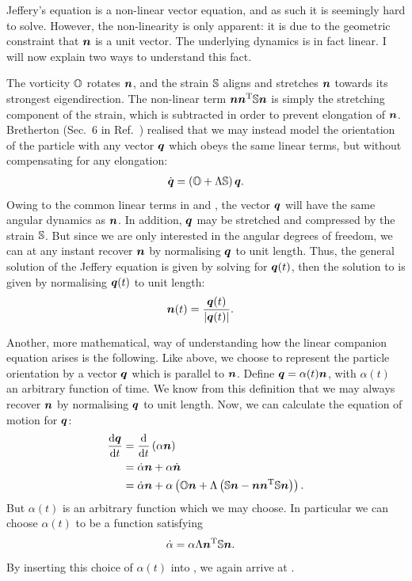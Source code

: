 \documentclass[thesis.tex]{subfiles}
\begin{document}
Jeffery's equation is a non-linear vector equation, and as such it is seemingly hard to solve. However, the non-linearity is only apparent: it is due to the geometric constraint that $\mbox{\boldmath$n$}$ is a unit vector. The underlying dynamics is in fact linear. I will now explain two ways to understand this fact.

The vorticity $\mathbb{O}$ rotates $\mbox{\boldmath$n$}$, and the strain $\mathbb{S}$ aligns and stretches $\mbox{\boldmath$n$}$ towards its strongest eigendirection. The non-linear term $\mbox{\boldmath$n$} \mbox{\boldmath$n$}^{\mathrm T} \mathbb{S} \mbox{\boldmath$n$}$ is simply the stretching component of the strain, which is subtracted in order to prevent elongation of $\mbox{\boldmath$n$}$. Bretherton (Sec.~6 in Ref.~\cite{bretherton1962}) realised that we may instead model the orientation of the particle with any vector $\mbox{\boldmath$q$}$ which obeys the same linear terms, but without compensating for any elongation:
\begin{align}
	\dot{\ve q} = \left(\ma O + \Lambda \ma S\right) \ve q.\eqnlab{jefferyq}
\end{align}
Owing to the common linear terms in  and , the vector $\mbox{\boldmath$q$}$ will have the same angular dynamics as $\mbox{\boldmath$n$}$. In addition, $\mbox{\boldmath$q$}$ may be stretched and compressed by the strain $\mathbb{S}$. But since we are only interested in the angular degrees of freedom, we can at any instant recover $\mbox{\boldmath$n$}$ by normalising $\mbox{\boldmath$q$}$ to unit length. Thus, the general solution of the Jeffery equation is given by solving  for $\mbox{\boldmath$q$}(t)$, then the solution to  is given by normalising $\mbox{\boldmath$q$}(t)$ to unit length:
\begin{align}
	\ve n(t) &= \frac{\ve q(t)}{|\ve q(t)|}.\eqnlab{jefferysolution0}
\end{align}

Another, more mathematical, way of understanding how the linear companion equation  arises is the following. Like above, we choose to represent the particle orientation by a vector $\mbox{\boldmath$q$}$ which is parallel to $\mbox{\boldmath$n$}$. Define $\mbox{\boldmath$q$} = \alpha(t)\mbox{\boldmath$n$}$, with $\alpha(t)$ an arbitrary function of time. We know from this definition that we may always recover $\mbox{\boldmath$n$}$ by normalising $\mbox{\boldmath$q$}$ to unit length. Now, we can calculate the equation of motion for $\mbox{\boldmath$q$}$:
\begin{align}
	\diff{\ve q}{t} &= \diff{}{t}\left(\alpha \ve n\right) \nn \\
	&= \dot \alpha \ve n + \alpha \dot{\ve n} \nn\\
	&= \dot \alpha \ve n + \alpha \left(\ma O \ve n + \Lambda \left(\ma S \ve n - \ve n \ve n \transpose \ma S \ve n\right)\right). \eqnlab{jefferyderivation1}
\end{align}
But $\alpha(t)$ is an arbitrary function which we may choose. In particular we can choose $\alpha(t)$ to be a function satisfying
\begin{align*}
	\dot \alpha &= \alpha \Lambda \mbox{\boldmath$n$}^{\mathrm T} \mathbb{S} \mbox{\boldmath$n$}.
\end{align*}
By inserting this choice of $\alpha(t)$ into , we again arrive at .
\end{document}
